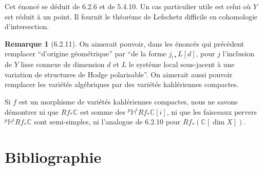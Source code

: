 \documentclass[12pt,a4paper]{article}
\theoremstyle{plain}
\theoremstyle{definition}
\newtheorem{remark}[theorem]{Remarque}
\theoremstyle{remark}
\newcommand{\CC}{\mathbb{C}}
\newcommand{\HH}{\mathbb{H}}
\begin{document}
Cet \'enonc\'e se d\'eduit de 6.2.6 et de 5.4.10. Un cas particulier utile est celui o\`u $Y$ est r\'eduit \`a un point. Il fournit le th\'eor\`eme de Lefschetz difficile en cohomologie d'intersection.

\begin{remark}[6.2.11]
On aimerait pouvoir, dans les \'enonc\'es qui pr\'ec\`edent remplacer ``d'origine g\'eom\'etrique'' par ``de la forme $j_{!*}L[d]$, pour $j$ l'inclusion de $Y$ lisse connexe de dimension $d$ et $L$ le syst\`eme local sous-jacent \`a une variation de structures de Hodge polarisable''. On aimerait aussi pouvoir remplacer les vari\'et\'es alg\'ebriques par des vari\'et\'es kahl\'eriennes compactes.

Si $f$ est un morphisme de vari\'et\'es kahl\'eriennes compactes, nous ne savons d\'emontrer ni que $Rf_*\CC$ est somme des ${}^{p}\HH^iRf_*\CC[i]$, ni que les faisceaux pervers ${}^{p}\HH^iRf_*\CC$ sont semi-simples, ni l'analogue de 6.2.10 pour $Rf_*(\CC[\dim X])$.
\end{remark}

\newpage
\section*{Bibliographie}
\end{document}
